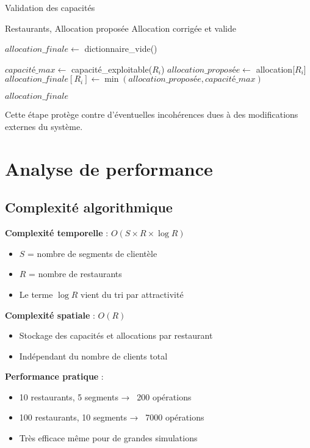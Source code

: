 \documentclass[12pt,a4paper]{article}
\begin{document}
\begin{algorithm}[H]
\caption{Validation des capacités}
\begin{algorithmic}[1]
\REQUIRE Restaurants, Allocation proposée
\ENSURE Allocation corrigée et valide

\STATE $allocation\_finale \leftarrow$ dictionnaire\_vide()

    \STATE $capacité\_max \leftarrow$ capacité\_exploitable($R_i$)
    \STATE $allocation\_proposée \leftarrow$ allocation[$R_i$]
    \STATE $allocation\_finale[R_i] \leftarrow \min(allocation\_proposée, capacité\_max)$
\ENDFOR

\RETURN $allocation\_finale$
\end{algorithmic}
\end{algorithm}

Cette étape protège contre d'éventuelles incohérences dues à des modifications externes du système.

\section{Analyse de performance}

\subsection{Complexité algorithmique}

\textbf{Complexité temporelle} : $O(S \times R \times \log R)$
\begin{itemize}
    \item $S$ = nombre de segments de clientèle
    \item $R$ = nombre de restaurants
    \item Le terme $\log R$ vient du tri par attractivité
\end{itemize}

\textbf{Complexité spatiale} : $O(R)$
\begin{itemize}
    \item Stockage des capacités et allocations par restaurant
    \item Indépendant du nombre de clients total
\end{itemize}

\textbf{Performance pratique} :
\begin{itemize}
    \item 10 restaurants, 5 segments → ~200 opérations
    \item 100 restaurants, 10 segments → ~7000 opérations
    \item Très efficace même pour de grandes simulations
\end{itemize}
\end{document}
